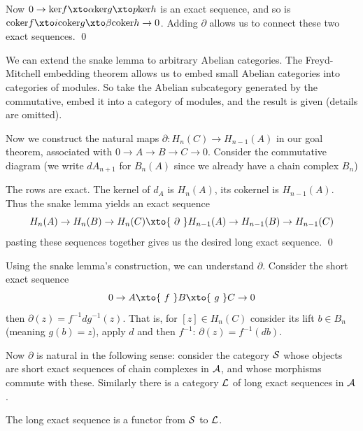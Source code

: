     Now $0\to\ker f\xto\alpha\ker g\xto p\ker h$ is an exact sequence, and so is $\coker f\xto i\coker g\xto\beta\coker h\to0$.
    Adding $\partial$ allows us to connect these two exact sequences.
    \qed

\eproof

We can extend the snake lemma to arbitrary Abelian categories.
The Freyd-Mitchell embedding theorem allows us to embed small Abelian categories into categories of modules.
So take the Abelian subcategory generated by the commutative, embed it into a category of modules, and the result is given (details are omitted).

Now we construct the natural maps $\partial\colon H_n(C)\to H_{n-1}(A)$ in our goal theorem, associated with $0\to A\to B\to C\to0$.
Consider the commutative diagram (we write $dA_{n+1}$ for $B_n(A)$ since we already have a chain complex $B_n$)

\centerline{}

The rows are exact.
The kernel of $d_A$ is $H_n(A)$, its cokernel is $H_{n-1}(A)$.
Thus the snake lemma yields an exact sequence
$$ H_n(A) \to H_n(B) \to H_n(C) \xto{\ \partial\ } H_{n-1}(A) \to H_{n-1}(B) \to H_{n-1}(C) $$
pasting these sequences together gives us the desired long exact sequence.
\qed

Using the snake lemma's construction, we can understand $\partial$.
Consider the short exact sequence
$$ 0 \to A \xto{\ f\ } B \xto{\ g \ } C \to 0 $$
then $\partial(z)=f^{-1}dg^{-1}(z)$.
That is, for $[z]\in H_n(C)$ consider its lift $b\in B_n$ (meaning $g(b)=z$), apply $d$ and then $f^{-1}$: $\partial(z)=f^{-1}(db)$.

Now $\partial$ is natural in the following sense: consider the category ${\cal S}$ whose objects are short exact sequences of chain complexes in ${{\cal A}}$, and whose morphisms commute with these.
Similarly there is a category ${\cal L}$ of long exact sequences in ${{\cal A}}$.

\bprop

    The long exact sequence is a functor from ${\cal S}$ to ${\cal L}$.

